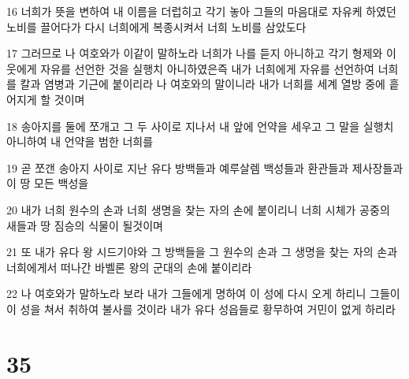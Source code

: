 \par 16 너희가 뜻을 변하여 내 이름을 더럽히고 각기 놓아 그들의 마음대로 자유케 하였던 노비를 끌어다가 다시 너희에게 복종시켜서 너희 노비를 삼았도다
\par 17 그러므로 나 여호와가 이같이 말하노라 너희가 나를 듣지 아니하고 각기 형제와 이웃에게 자유를 선언한 것을 실행치 아니하였은즉 내가 너희에게 자유를 선언하여 너희를 칼과 염병과 기근에 붙이리라 나 여호와의 말이니라 내가 너희를 세계 열방 중에 흩어지게 할 것이며
\par 18 송아지를 둘에 쪼개고 그 두 사이로 지나서 내 앞에 언약을 세우고 그 말을 실행치 아니하여 내 언약을 범한 너희를
\par 19 곧 쪼갠 송아지 사이로 지난 유다 방백들과 예루살렘 백성들과 환관들과 제사장들과 이 땅 모든 백성을
\par 20 내가 너희 원수의 손과 너희 생명을 찾는 자의 손에 붙이리니 너희 시체가 공중의 새들과 땅 짐승의 식물이 될것이며
\par 21 또 내가 유다 왕 시드기야와 그 방백들을 그 원수의 손과 그 생명을 찾는 자의 손과 너희에게서 떠나간 바벨론 왕의 군대의 손에 붙이리라
\par 22 나 여호와가 말하노라 보라 내가 그들에게 명하여 이 성에 다시 오게 하리니 그들이 이 성을 쳐서 취하여 불사를 것이라 내가 유다 성읍들로 황무하여 거민이 없게 하리라

\chapter{35}

